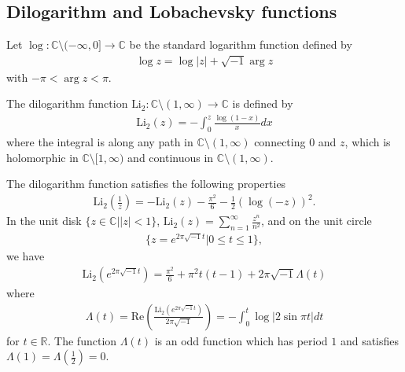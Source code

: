 \documentclass[12pt]{amsart}
\begin{document}
\subsection{Dilogarithm and Lobachevsky functions}
Let $\log: \mathbb{C}\setminus (-\infty,0]\rightarrow \mathbb{C}$ be the standard logarithm function defined by 
\begin{align}
    \log z=\log |z|+\sqrt{-1}\arg z
\end{align}
with $-\pi <\arg z<\pi$. 

The dilogarithm function $\text{Li}_2: \mathbb{C}\setminus (1,\infty)\rightarrow \mathbb{C}$ is defined by 
\begin{align}
    \text{Li}_2(z)=-\int_0^{z}\frac{\log(1-x)}{x}dx
\end{align}
where the integral is along any path in $\mathbb{C}\setminus (1,\infty)$ connecting $0$ and $z$, which is holomorphic in $\mathbb{C}\setminus [1,\infty)$ and continuous in $\mathbb{C}\setminus (1,\infty)$. 

The dilogarithm function satisfies the following properties 
\begin{align}
    \text{Li}_2\left(\frac{1}{z}\right)=-\text{Li}_2(z)-\frac{\pi^2}{6}-\frac{1}{2}(\log(-z) )^2.
\end{align}
In the unit disk $\{z\in \mathbb{C}| |z|<1\}$,  $\text{Li}_2(z)=\sum_{n=1}^{\infty}\frac{z^n}{n^2}$, and on the unit circle 
\begin{align}
 \{z=e^{2\pi \sqrt{-1}t}|0 \leq t\leq 1\},    
\end{align}
we have
\begin{align}
    \text{Li}_2(e^{2\pi\sqrt{-1} t})=\frac{\pi^2}{6}+\pi^2t(t-1)+2\pi \sqrt{-1}\Lambda(t)
\end{align}
where 
\begin{align} \label{formula-Lambda(t)}
\Lambda(t)=\text{Re}\left(\frac{\text{Li}_2(e^{2\pi \sqrt{-1}t})}{2\pi \sqrt{-1}}\right)=-\int_{0}^{t}\log|2 \sin \pi t|d t 
\end{align}
for $t\in \mathbb{R}$. The function $\Lambda(t)$ is an odd function which has period $1$ and satisfies 
$
\Lambda(1)=\Lambda(\frac{1}{2})=0.
$
\end{document}
